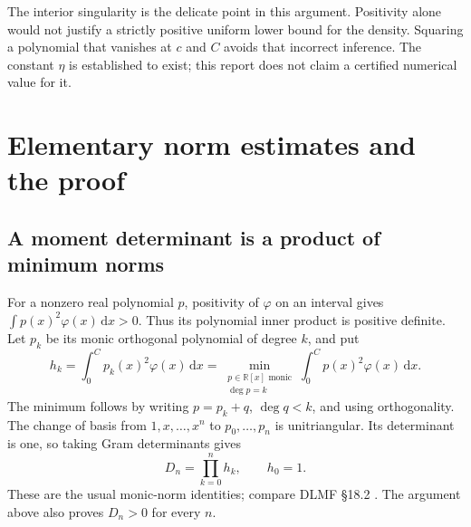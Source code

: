 \documentclass[11pt,a4paper]{article}
\numberwithin{equation}{section}
\theoremstyle{remark}\newtheorem{remark}[theorem]{Remark}
\newcommand{\dd}{\,\mathrm d}
\newcommand{\R}{\mathbb R}
\begin{document}
The interior singularity is the delicate point in this argument. Positivity
alone would not justify a strictly positive uniform lower bound for the
density. Squaring a polynomial that vanishes at $c$ and $C$ avoids that
incorrect inference. The constant $\eta$ is established to exist; this report
does not claim a certified numerical value for it.

\section{Elementary norm estimates and the proof}
\subsection{A moment determinant is a product of minimum norms}
For a nonzero real polynomial $p$, positivity of $\varphi$ on an interval gives
$\int p(x)^2\varphi(x)\dd x>0$. Thus its polynomial inner product is positive
definite. Let $p_k$ be its monic orthogonal polynomial of degree $k$, and put
\begin{equation}\label{eq:hk}
 h_k=\int_0^C p_k(x)^2\varphi(x)\dd x
 =\min_{\substack{p\in\R[x]\text{ monic}\\\deg p=k}}
      \int_0^C p(x)^2\varphi(x)\dd x.
\end{equation}
The minimum follows by writing $p=p_k+q$, $\deg q<k$, and using orthogonality.
The change of basis from $1,x,\ldots,x^n$ to $p_0,\ldots,p_n$ is unitriangular.
Its determinant is one, so taking Gram determinants gives
\begin{equation}\label{eq:product}
 D_n=\prod_{k=0}^n h_k,\qquad h_0=1.
\end{equation}
These are the usual monic-norm identities; compare DLMF \S18.2
\cite{dlmf}. The argument above also proves $D_n>0$ for every $n$.
\end{document}
